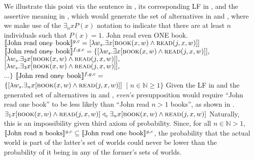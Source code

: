 We illustrate this point via the sentence in , its corresponding LF in , and the assertive meaning in , which would generate the set of alternatives in  and , where we make use of the $\exists_nxP(x)$ notation to indicate that there are at least $n$ individuals such that $P(x)=1$.
\pex[nopreamble=true]%
\a{}\ljudge{\#} John read even \MakeUppercase{one} book.
\a[]\phantomsection [even\textsubscript{C} [John read one\textsubscript{F} book]
\a{} $\intension[g,c]{John read one\textsubscript{F} book}=[\lambda{w_s}.\exists{x}[\predicate{book}(x,w)\land\predicate{read}(j,x,w)]]$
\a{} $\intension[f,g,c]{John read one\textsubscript{F} book}=\{[\lambda{w_s}.\exists{x}[\predicate{book}(x,w)\land\predicate{read}(j,x,w)]],$\\
$[\lambda{w_s}.\exists_2{x}[\predicate{book}(x,w)\land\predicate{read}(j,x,w)]],$\\
$[\lambda{w_s}.\exists_3{x}[\predicate{book}(x,w)\land\predicate{read}(j,x,w)]],$\\
$\ldots\}$
\a{} $\intension[f,g,c]{John read one\textsubscript{F} book}=$\\\emptyfill$\{[\lambda{w_s}.\exists_n{x}[\predicate{book}(x,w)\land\predicate{read}(j,x,w)]]$~| $n\in\mathbb{N}\geqslant1\}$
\xe
Given the LF in  and the generated set of alternatives in  and , \textit{even}'s presupposition would require \enquote{John read one book} to be less likely than \enquote{John read $n>1$ books}, as shown in .
\ex{}
{}\\$\exists_1{x}[\predicate{book}(x,w)\land\predicate{read}(j,x,w)]\lprob_c\exists_n{x}[\predicate{book}(x,w)\land\predicate{read}(j,x,w)]$
\xe
Naturally, this is an impossibility given  third axiom of probability. Since, for all $n\in\mathbb{N}>1$, $\intension[g,c]{John read n books}\subseteq\intension[g,c]{John read one book}$, the probability that the actual world is part of the latter's set of worlds could never be lower than the probability of it being in any of the former's sets of worlds.

